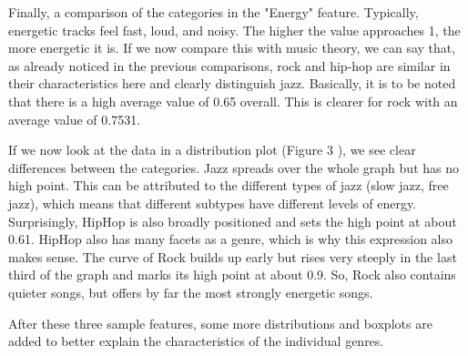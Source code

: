Finally, a comparison of the categories in the "Energy" feature.
Typically, energetic tracks feel fast, loud, and noisy.
The higher the value approaches 1, the more energetic it is.
If we now compare this with music theory, we can say that, as already noticed in the previous
comparisons, rock and hip-hop are similar in their characteristics here and clearly distinguish jazz.
Basically, it is to be noted that there is a high average value of 0.65 overall.
This is clearer for rock with an average value of 0.7531.

If we now look at the data in a distribution plot (Figure 3 ),
we see clear differences between the categories.
Jazz spreads over the whole graph but has no high point.
This can be attributed to the different types of jazz (slow jazz, free jazz),
which means that different subtypes have different levels of energy.
Surprisingly, HipHop is also broadly positioned and sets the high point at about 0.61.
HipHop also has many facets as a genre, which is why this expression also makes sense.
The curve of Rock builds up early but rises very steeply in the last third of the graph and marks
its high point at about 0.9. So, Rock also contains quieter songs,
but offers by far the most strongly energetic songs.

After these three sample features, some more distributions and boxplots are added to better
explain the characteristics of the individual genres.